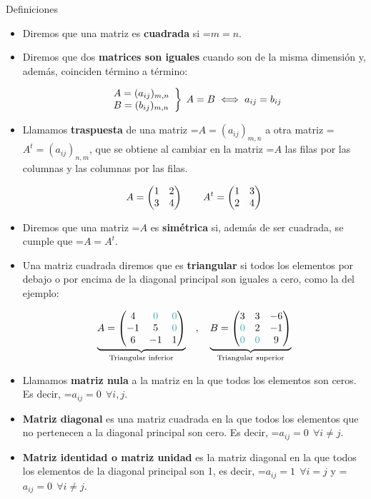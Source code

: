 \documentclass[11pt,a4paper]{article}
\newcommand{\fmm}[1]{\setbox0=\hbox{$#1$}\ifdim\wd0>\linewidth\fmdisp{#1}\else\mbox{\box0}\fi}
\newcommand{\fmdisp}[1]{\[\setbox2=\hbox{$\displaystyle #1$}\ifdim\wd2>\linewidth\resizebox{\linewidth}{!}{\box2}\else\box2\fi\]}
\begin{document}
\begin{fmdef}{Definiciones}
\begin{itemize}
\item Diremos que una matriz es \textbf{cuadrada} si \fmm{m=n}.
\item Diremos que dos \textbf{matrices son iguales} cuando son de la misma dimensión y, además, coinciden término a término:

\fmdisp{\left.\begin{array}{l} A=(a_{ij})_{m,n}\\ B=(b_{ij})_{m,n}\end{array}\right\}\; A=B \iff a_{ij}=b_{ij}}

\item Llamamos \textbf{traspuesta} de una matriz \fmm{A=(a_{ij})_{m,n}} a otra matriz \fmm{A^t=(a_{ij})_{n,m}}, que se obtiene al cambiar en la matriz \fmm{A} las filas por las columnas y las columnas por las filas.

\fmdisp{A=\begin{pmatrix}1 & 2\\ 3 & 4\end{pmatrix}\qquad A^t=\begin{pmatrix}1 & 3\\ 2 & 4\end{pmatrix}}

\item Diremos que una matriz \fmm{A} es \textbf{simétrica} si, además de ser cuadrada, se cumple que \fmm{A=A^t}.
\item Una matriz cuadrada diremos que es \textbf{triangular} si todos los elementos por debajo o por encima de la diagonal principal son iguales a cero, como la del ejemplo:

\fmdisp{\underbrace{A=\begin{pmatrix}4 & \color[HTML]{2bb3a3}0 & \color[HTML]{2bb3a3}0\\ -1 & 5 & \color[HTML]{2bb3a3}0\\ 6 & -1 & 1\end{pmatrix}}_{\text{Triangular inferior}}\quad,\quad \underbrace{B=\begin{pmatrix}3 & 3 & -6\\ \color[HTML]{2bb3a3}0 & 2 & -1\\ \color[HTML]{2bb3a3}0 & \color[HTML]{2bb3a3}0 & 9\end{pmatrix}}_{\text{Triangular superior}}}

\item Llamamos \textbf{matriz nula} a la matriz en la que todos los elementos son ceros. Es decir, \fmm{a_{ij}=0\ \ \forall i,j}.
\item \textbf{Matriz diagonal} es una matriz cuadrada en la que todos los elementos que no pertenecen a la diagonal principal son cero. Es decir, \fmm{a_{ij}=0\ \ \forall i\neq j}.
\item \textbf{Matriz identidad o matriz unidad} es la matriz diagonal en la que todos los elementos de la diagonal principal son 1, es decir, \fmm{a_{ij}=1\ \ \forall i=j} y \fmm{a_{ij}=0\ \ \forall i\neq j}.
\end{itemize}
\end{fmdef}
\end{document}

